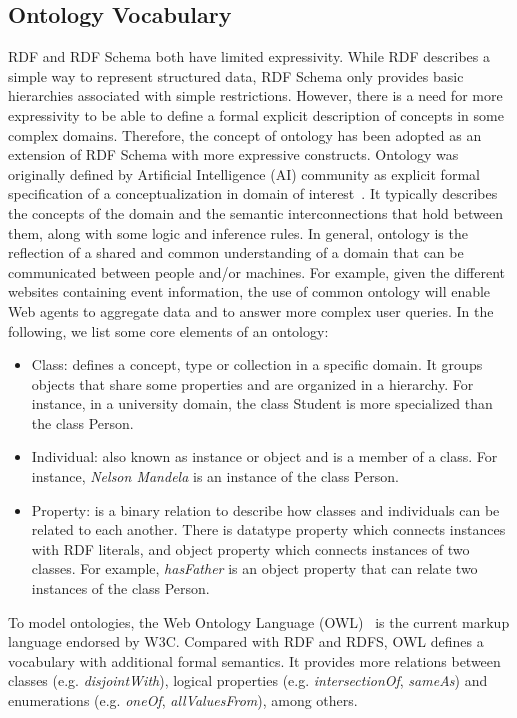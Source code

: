 \subsection{Ontology Vocabulary}
RDF and RDF Schema both have limited expressivity. While RDF describes a simple way to represent structured data, RDF Schema only provides basic hierarchies associated with simple restrictions. However, there is a need for more expressivity to be able to define a formal explicit description of concepts in some complex domains. Therefore, the concept of ontology has been adopted as an extension of RDF Schema with more expressive constructs. Ontology was originally defined by Artificial Intelligence (AI) community as explicit formal specification of a conceptualization in domain of interest~\cite{Gruber:1993}. It typically describes the concepts of the domain and the semantic interconnections that hold between them, along with some logic and inference rules. In general, ontology is the reflection of a shared and common  understanding of a domain that can be communicated between people and/or machines. For example, given the different websites containing event information, the use of common ontology will enable Web agents to aggregate data and to answer more complex user queries. In the following, we list some core elements of an ontology:

\begin{itemize}
\item Class: defines a concept, type or collection in a specific domain. It groups objects that share some properties and are organized in a hierarchy. For instance, in a university domain, the class Student is more specialized than the class Person.
\item Individual: also known as instance or object and is a member of a class. For instance, \emph{Nelson Mandela} is an instance of the class Person.
\item Property: is a binary relation to describe how classes and individuals can be related to each another. There is datatype property which connects instances with RDF literals, and object property which connects instances of two classes. For example, \emph{hasFather} is an object property that can relate two instances of the class Person.
\end{itemize}

To model ontologies, the Web Ontology Language (OWL)~\cite{OWL:2012} is the current markup language endorsed by W3C. Compared with RDF and RDFS, OWL defines a vocabulary with additional formal semantics. It provides more relations between classes (e.g. \emph{disjointWith}), logical properties (e.g. \emph{intersectionOf}, \emph{sameAs}) and enumerations (e.g. \emph{oneOf}, \emph{allValuesFrom}), among others.

